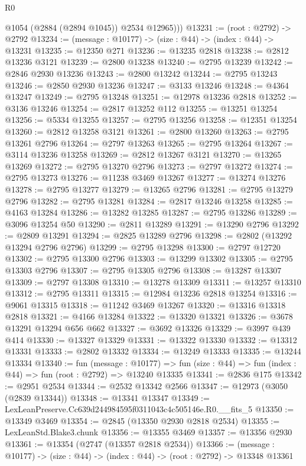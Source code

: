 \begin{lexlean}{R0}
\begin{coremodule}
          @1054
          (@2884 (@2894 @1045))
          @2534
          @12965)))
@13231 := (root : @2792) -> @2792
@13234 := (message : @10177) -> (size : @44) -> (index : @44) -> @13231
@13235 := @12350 @271
@13236 := @13235 @2818
@13238 := @2812 @13236 @3121
@13239 := @2800 @13238
@13240 := @2795 @13239
@13242 := @2846 @2930 @13236
@13243 := @2800 @13242
@13244 := @2795 @13243
@13246 := @2850 @2930 @13236
@13247 := @3133 @13246
@13248 := @4364 @13247
@13249 := @2795 @13248
@13251 := @12978 @13236 @2818
@13252 := @3136 @13246
@13254 := @2817 @13252 @112
@13255 := @13251 @13254
@13256 := @5334 @13255
@13257 := @2795 @13256
@13258 := @12351 @13254
@13260 := @2812 @13258 @3121
@13261 := @2800 @13260
@13263 := @2795 @13261 @2796
@13264 := @2797 @13263
@13265 := @2795 @13264
@13267 := @3114 @13236 @13258
@13269 := @2812 @13267 @3121
@13270 := @13265 @13269
@13272 := @2795 @13270 @2796
@13273 := @2797 @13272
@13274 := @2795 @13273
@13276 := @11238 @3469 @13267
@13277 := @13274 @13276
@13278 := @2795 @13277
@13279 := @13265 @2796
@13281 := @2795 @13279 @2796
@13282 := @2795 @13281
@13284 := @2817 @13246 @13258
@13285 := @4163 @13284
@13286 := @13282 @13285
@13287 := @2795 @13286
@13289 := @3096 @13254 @50
@13290 := @2811 @13289
@13291 := @13290 @2796
@13292 := @2809 @13291
@13294 := @2825 @13289 @2796
@13298 := @2802 (@13292 @13294 @2796 @2796)
@13299 := @2795 @13298
@13300 := @2797 @12720
@13302 := @2795 @13300 @2796
@13303 := @13299 @13302
@13305 := @2795 @13303 @2796
@13307 := @2795 @13305 @2796
@13308 := @13287 @13307
@13309 := @2797 @13308
@13310 := @13278 @13309
@13311 := @13257 @13310
@13312 := @2795 @13311
@13315 := @12984 @13236 @2818 @13254
@13316 := @9061 @13315
@13318 := @11242 @3469 @13267
@13320 := @13316 @13318 @2818
@13321 := @4166 @13284
@13322 := @13320 @13321
@13326 := @3678 @13291 @13294 @656 @662
@13327 := @3692 @13326
@13329 := @3997 @439 @414
@13330 := @13327 @13329
@13331 := @13322 @13330
@13332 := @13312 @13331
@13333 := @2802 @13332
@13334 := @13249 @13333
@13335 := @13244 @13334
@13340 := fun (message : @10177) =>
  fun (size : @44) => fun (index : @44) => fun (root : @2792) => @13240 @13335
@13341 := @2836 @175
@13342 := @2951 @2534
@13344 := @2532 @13342 @2566
@13347 := @12973 (@3050 (@2839 @13344))
@13348 := @13341 @13347
@13349 := LexLeanPreserve.Cc639d244984595f0311043c4c505146e.R0.__fits_5
@13350 := @13349 @3469
@13354 := @2845 (@13350 @2930 @2818 @2534)
@13355 := LexLeanStd.Blake3.chunk
@13356 := @13355 @3469
@13357 := @13356 @2930
@13361 := @13354 (@2747 (@13357 @2818 @2534))
@13366 := (message : @10177) -> (size : @44) -> (index : @44) -> (root : @2792) -> @13348 @13361

\end{coremodule}
\end{lexlean}
